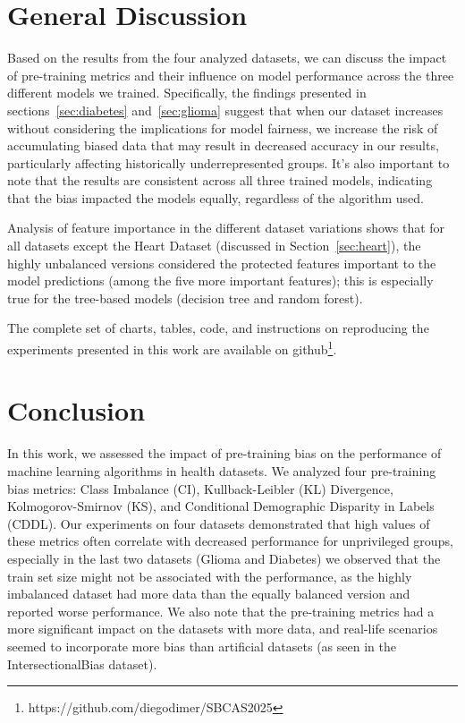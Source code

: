 \documentclass[12pt]{article}
\begin{document}
\section{General Discussion}

Based on the results from the four analyzed datasets, we can discuss the impact of pre-training metrics and their influence on model performance across the three different models we trained. Specifically, the findings presented in sections~\ref{sec:diabetes} and~\ref{sec:glioma} suggest that when our dataset increases without considering the implications for model fairness, we increase the risk of accumulating biased data that may result in decreased accuracy in our results, particularly affecting historically underrepresented groups. It's also important to note that the results are consistent across all three trained models, indicating that the bias impacted the models equally, regardless of the algorithm used. 

Analysis of feature importance in the different dataset variations shows that for all datasets except the Heart Dataset (discussed in Section~\ref{sec:heart}), the highly unbalanced versions considered the protected features important to the model predictions (among the five more important features); this is especially true for the tree-based models (decision tree and random forest).

The complete set of charts, tables, code, and instructions on reproducing the experiments presented in this work are available on github\footnote{https://github.com/diegodimer/SBCAS2025}.

\section{Conclusion}

In this work, we assessed the impact of pre-training bias on the performance of machine learning algorithms in health datasets. We analyzed four pre-training bias metrics: Class Imbalance (CI), Kullback-Leibler (KL) Divergence, Kolmogorov-Smirnov (KS), and Conditional Demographic Disparity in Labels (CDDL). Our experiments on four datasets demonstrated that high values of these metrics often correlate with decreased performance for unprivileged groups, especially in the last two datasets (Glioma and Diabetes) we observed that the train set size might not be associated with the performance, as the highly imbalanced dataset had more data than the equally balanced version and reported worse performance. We also note that the pre-training metrics had a more significant impact on the datasets with more data, and real-life scenarios seemed to incorporate more bias than artificial datasets (as seen in the IntersectionalBias dataset).
\end{document}
